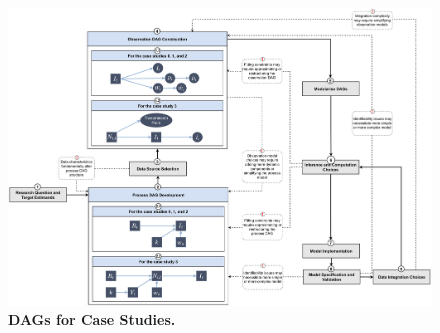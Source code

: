 \documentclass{article}
\begin{document}

\begin{figure}[htbp]
    \centering
    \includegraphics[width=\textwidth]{figures/case_study_diagram.drawio.pdf}
    \caption{\textbf{DAGs for Case Studies.} }
    \label{fig:case_study_diagram}
\end{figure}
\end{document}

